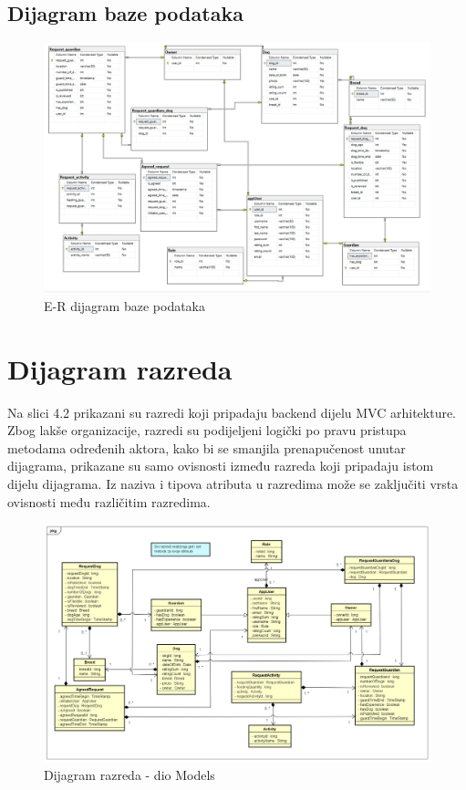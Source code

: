 			
			
		\eject
			\subsection{Dijagram baze podataka}
			
			\begin{figure}[htb]
				\centering
				\includegraphics[width=16cm]{slike/dijagramASCP}
				\caption{E-R dijagram baze podataka} 
				\label{fig:E-Rdijagram}
			\end{figure}
			
			\eject
			
			
		\section{Dijagram razreda}
		
			Na slici 4.2 prikazani su razredi koji pripadaju backend dijelu MVC arhitekture.  Zbog lakše organizacije, razredi su podijeljeni logički po pravu pristupa metodama određenih aktora, kako bi se smanjila prenapučenost unutar dijagrama, prikazane su samo ovisnosti između razreda koji pripadaju istom dijelu dijagrama. Iz naziva i tipova atributa u razredima može se zaključiti vrsta ovisnosti među različitim razredima.
			
			\begin{figure}[htb]
				\centering
				\includegraphics[width=16cm]{slike/Class Diagram}
				\caption{Dijagram razreda - dio Models} 
				\label{fig:Class-Diagram}
			\end{figure}
		
